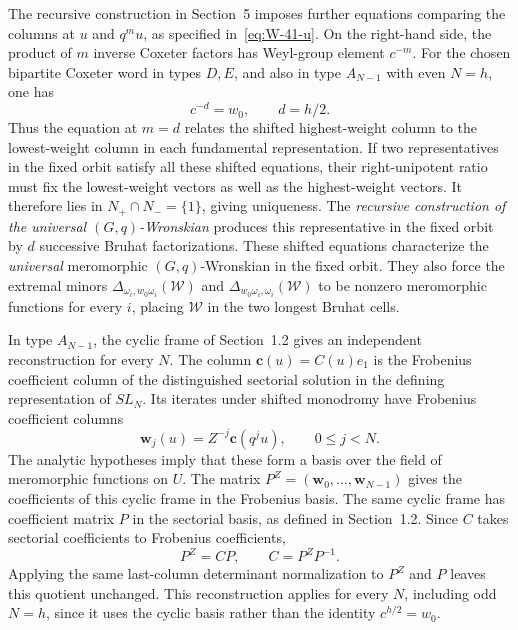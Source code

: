 \documentclass[11pt,leqno]{amsart}
\numberwithin{equation}{section}
\theoremstyle{plain}
\theoremstyle{definition}
\theoremstyle{plain}
\theoremstyle{definition}
\theoremstyle{remark}
\begin{document}
The recursive construction in Section~5 imposes further equations comparing the columns at $u$ and $q^mu$, as specified in~\eqref{eq:W-41-u}.  On the right-hand side, the product of $m$ inverse Coxeter factors has Weyl-group element $c^{-m}$.  For the chosen bipartite Coxeter word in types $D,E$, and also in type $A_{N-1}$ with even $N=h$, one has
\[
 c^{-d}=w_0,\qquad d=h/2.
\]
Thus the equation at $m=d$ relates the shifted highest-weight column to the lowest-weight column in each fundamental representation.  If two representatives in the fixed orbit satisfy all these shifted equations, their right-unipotent ratio must fix the lowest-weight vectors as well as the highest-weight vectors.  It therefore lies in $N_+\cap N_-=\{1\}$, giving uniqueness.  The \emph{recursive construction of the universal $(G,q)$-Wronskian} produces this representative in the fixed orbit by $d$ successive Bruhat factorizations.  These shifted equations characterize the \emph{universal} meromorphic $(G,q)$-Wronskian in the fixed orbit.  They also force the extremal minors $\Delta_{\omega_i,w_0\omega_i}(\mathscr W)$ and $\Delta_{w_0\omega_i,\omega_i}(\mathscr W)$ to be nonzero meromorphic functions for every $i$, placing $\mathscr W$ in the two longest Bruhat cells.

In type $A_{N-1}$, the cyclic frame of Section~1.2 gives an independent reconstruction for every $N$.  The column $\mathbf c(u)=C(u)e_1$ is the Frobenius coefficient column of the distinguished sectorial solution in the defining representation of $SL_N$.  Its iterates under shifted monodromy have Frobenius coefficient columns
\[
 \mathbf w_j(u)=Z^{-j}\mathbf c(q^ju),\qquad 0\le j<N.
\]
The analytic hypotheses imply that these form a basis over the field of meromorphic functions on $U$.  The matrix $P^Z=(\mathbf w_0,\ldots,\mathbf w_{N-1})$ gives the coefficients of this cyclic frame in the Frobenius basis.  The same cyclic frame has coefficient matrix $P$ in the sectorial basis, as defined in Section~1.2.  Since $C$ takes sectorial coefficients to Frobenius coefficients,
\[
 P^Z=CP,\qquad C=P^ZP^{-1}.
\]
Applying the same last-column determinant normalization to $P^Z$ and $P$ leaves this quotient unchanged.  This reconstruction applies for every $N$, including odd $N=h$, since it uses the cyclic basis rather than the identity $c^{h/2}=w_0$.
\end{document}
